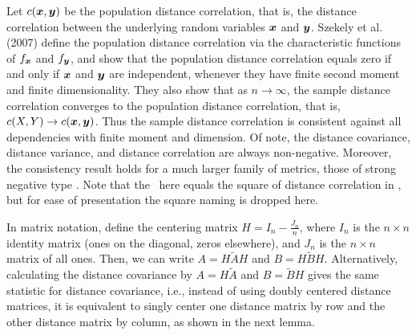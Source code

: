 \documentclass[11pt]{article}
\begin{document}
Let $c(\boldsymbol{x},\boldsymbol{y})$ be the population distance correlation, that is, the distance correlation between the underlying random variables $\boldsymbol{x}$ and $\boldsymbol{y}$. Szekely et al. (2007)  define the population distance correlation  via the characteristic functions of $f_{\boldsymbol{x}}$ and $f_{\boldsymbol{y}}$, and show that the population distance correlation equals zero if and only if $\boldsymbol{x}$ and $\boldsymbol{y}$ are independent, whenever they have finite second moment and finite dimensionality.
They also show that  as $n \rightarrow \infty$, the sample distance correlation converges to the population distance correlation, that is, $c(X,Y) \rightarrow c(\boldsymbol{x},\boldsymbol{y})$. Thus the sample distance correlation is consistent against all dependencies with finite moment and dimension. 
Of note, the distance covariance, distance variance, and distance correlation are always non-negative.  Moreover,  the consistency result holds for a much larger family of metrics, those of strong negative type  \cite{Lyons2013}. 
Note that the \Dcorr~here equals the square of distance correlation in \cite{SzekelyRizzoBakirov2007}, but for ease of presentation the square naming is dropped here.

In matrix notation, define the centering matrix $H=I_{n}-\frac{J_{n}}{n}$, where $I_n$ is the $n \times n$ identity matrix (ones on the diagonal, zeros elsewhere), and $J_n$ is the $n \times n$ matrix of all ones. Then, we can write  $A=H\tilde{A}H$ and $B=H\tilde{B}H$.
% 
Alternatively, calculating the distance covariance by $A=H\tilde{A}$ and $B=\tilde{B}H$ gives the same statistic for distance covariance, i.e., instead of using doubly centered distance matrices, it is equivalent to singly center one distance matrix by row and the other distance matrix by column, as shown in the next lemma.
\end{document}
